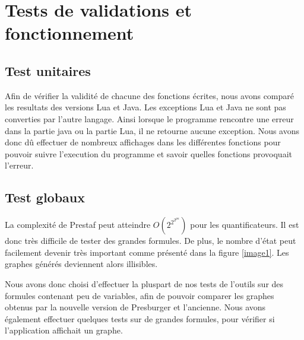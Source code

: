 \section{Tests de validations et fonctionnement}

\subsection{Test unitaires}

Afin de vérifier la validité de chacune des fonctions écrites, nous avons comparé les resultats des versions Lua et Java. Les exceptions Lua et Java ne sont pas converties par l'autre langage. Ainsi lorsque le programme rencontre une erreur dans la partie java ou la partie Lua, il ne retourne aucune exception. Nous avons donc dû effectuer de nombreux affichages dans les différentes fonctions pour pouvoir suivre l'execution du programme et savoir quelles fonctions provoquait l'erreur. 

\subsection{Test globaux}

La complexité de Prestaf peut atteindre $O(2^{2^{2^{pn}}})$ pour les quantificateurs. Il est donc très difficile de tester des grandes formules. De plus, le nombre d'état peut facilement devenir très important comme présenté dans la figure \ref{image1}. Les graphes générés deviennent alors illisibles.\par

Nous avons donc choisi d'effectuer la pluspart de nos tests de l'outils sur des formules contenant peu de variables, afin de pouvoir comparer les graphes obtenus par la nouvelle version de Presburger et l'ancienne. Nous avons également effectuer quelques tests sur de grandes formules, pour vérifier si l'application affichait un graphe.\clearpage

